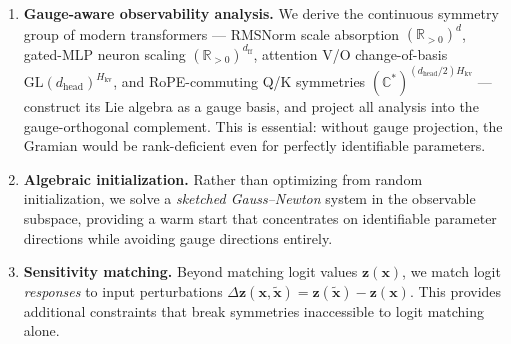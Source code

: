 \documentclass{article}
\newcommand{\R}{\mathbb{R}}
\newcommand{\bz}{\mathbf{z}}
\newcommand{\bx}{\mathbf{x}}
\begin{document}
\begin{enumerate}
    \item \textbf{Gauge-aware observability analysis.} We derive the continuous symmetry group of modern transformers --- RMSNorm scale absorption $(\R_{>0})^d$, gated-MLP neuron scaling $(\R_{>0})^{d_\text{ff}}$, attention V/O change-of-basis $\mathrm{GL}(d_\text{head})^{H_\text{kv}}$, and RoPE-commuting Q/K symmetries $(\mathbb{C}^*)^{(d_\text{head}/2)H_\text{kv}}$ --- construct its Lie algebra as a gauge basis, and project all analysis into the gauge-orthogonal complement. This is essential: without gauge projection, the Gramian would be rank-deficient even for perfectly identifiable parameters.

    \item \textbf{Algebraic initialization.} Rather than optimizing from random initialization, we solve a \emph{sketched Gauss--Newton} system in the observable subspace, providing a warm start that concentrates on identifiable parameter directions while avoiding gauge directions entirely.

    \item \textbf{Sensitivity matching.} Beyond matching logit values $\bz(\bx)$, we match logit \emph{responses} to input perturbations $\Delta\bz(\bx, \tilde{\bx}) = \bz(\tilde{\bx}) - \bz(\bx)$. This provides additional constraints that break symmetries inaccessible to logit matching alone.
\end{enumerate}
\end{document}
